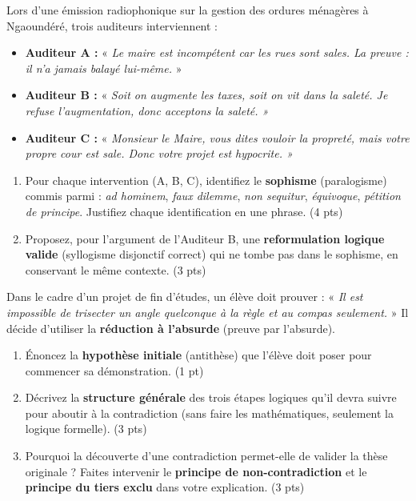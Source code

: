\documentclass[11pt]{article}
\begin{document}
\begin{exercice}
Lors d'une émission radiophonique sur la gestion des ordures ménagères à Ngaoundéré, trois auditeurs interviennent :
\begin{itemize}
    \item \textbf{Auditeur A :} « \textit{Le maire est incompétent car les rues sont sales. La preuve : il n'a jamais balayé lui-même.} »
    \item \textbf{Auditeur B :} « \textit{Soit on augmente les taxes, soit on vit dans la saleté. Je refuse l'augmentation, donc acceptons la saleté. »}
    \item \textbf{Auditeur C :} « \textit{Monsieur le Maire, vous dites vouloir la propreté, mais votre propre cour est sale. Donc votre projet est hypocrite. »}
\end{itemize}
\begin{enumerate}
    \item Pour chaque intervention (A, B, C), identifiez le \textbf{sophisme} (paralogisme) commis parmi : \textit{ad hominem}, \textit{faux dilemme}, \textit{non sequitur}, \textit{équivoque}, \textit{pétition de principe}. Justifiez chaque identification en une phrase. (4 pts)
    \item Proposez, pour l'argument de l'Auditeur B, une \textbf{reformulation logique valide} (syllogisme disjonctif correct) qui ne tombe pas dans le sophisme, en conservant le même contexte. (3 pts)
\end{enumerate}
\end{exercice}

\begin{exercice}
Dans le cadre d'un projet de fin d'études, un élève doit prouver : « \textit{Il est impossible de trisecter un angle quelconque à la règle et au compas seulement.} » Il décide d'utiliser la \textbf{réduction à l'absurde} (preuve par l'absurde).
\begin{enumerate}
    \item Énoncez la \textbf{hypothèse initiale} (antithèse) que l'élève doit poser pour commencer sa démonstration. (1 pt)
    \item Décrivez la \textbf{structure générale} des trois étapes logiques qu'il devra suivre pour aboutir à la contradiction (sans faire les mathématiques, seulement la logique formelle). (3 pts)
    \item Pourquoi la découverte d'une contradiction permet-elle de valider la thèse originale ? Faites intervenir le \textbf{principe de non-contradiction} et le \textbf{principe du tiers exclu} dans votre explication. (3 pts)
\end{enumerate}
\end{exercice}
\end{document}
